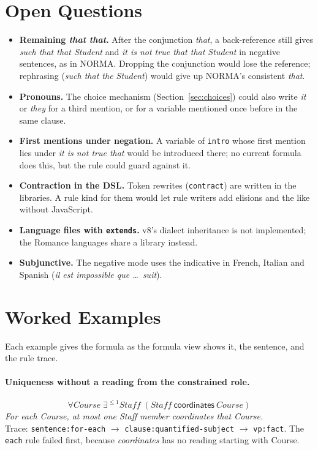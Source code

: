 \documentclass[11pt, a4paper]{article}
\newcommand{\code}[1]{\texttt{\color{codefg}#1}}
\begin{document}
\section{Open Questions}
\label{sec:open}

\begin{itemize}
  \item \textbf{Remaining \textit{that that}.} After the conjunction
        \textit{that}, a back-reference still gives \textit{such that that
        Student} and \textit{it is not true that that Student} in negative
        sentences, as in NORMA. Dropping the conjunction would lose the
        reference; rephrasing (\textit{such that the Student}) would give up
        NORMA's consistent \textit{that}.
  \item \textbf{Pronouns.} The choice mechanism (Section~\ref{sec:choices})
        could also write \textit{it} or \textit{they} for a third mention, or
        for a variable mentioned once before in the same clause.
  \item \textbf{First mentions under negation.} A variable of \code{intro}
        whose first mention lies under \textit{it is not true that} would be
        introduced there; no current formula does this, but the rule could
        guard against it.
  \item \textbf{Contraction in the DSL.} Token rewrites (\code{contract})
        are written in the libraries. A rule kind for them would let rule
        writers add elisions and the like without JavaScript.
  \item \textbf{Language files with \code{extends}.} v8's dialect
        inheritance is not implemented; the Romance languages share a
        library instead.
  \item \textbf{Subjunctive.} The negative mode uses the indicative in
        French, Italian and Spanish (\textit{il est impossible que \ldots\
        suit}).
\end{itemize}

\appendix

\section{Worked Examples}

Each example gives the formula as the formula view shows it, the sentence,
and the rule trace.

\paragraph{Uniqueness without a reading from the constrained role.}
\[
\forall \mathit{Course}\;\exists^{\le 1}\mathit{Staff}\;(\mathit{Staff}\ \textsf{coordinates}\ \mathit{Course})
\]
\textit{For each Course, at most one Staff member coordinates that Course.}\\
Trace: \code{sentence:for-each} $\to$ \code{clause:quantified-subject}
$\to$ \code{vp:fact}. The \code{each} rule failed first, because
\textit{coordinates} has no reading starting with Course.
\end{document}
